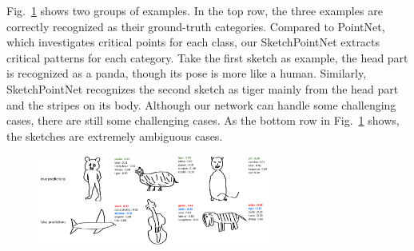 Fig.~\ref{fig:resshow} shows two groups of examples.
In the top row, the three examples are correctly recognized as their ground-truth categories.
Compared to PointNet, which investigates critical points for each class, our SketchPointNet extracts critical patterns for each category.
%
Take the first sketch as example, the head part is recognized as a panda, though its pose is more like a human. Similarly, SketchPointNet recognizes the second sketch as tiger mainly from the head part and the stripes on its body.
%
Although our network can handle some challenging cases, there are still some challenging cases.
As the bottom row in Fig.~\ref{fig:resshow} shows, the sketches are extremely ambiguous cases.

\begin{figure}[htbp]
    \center
    \includegraphics[width=3in]{images/res.png}
    \label{fig:resshow}
\end{figure}
